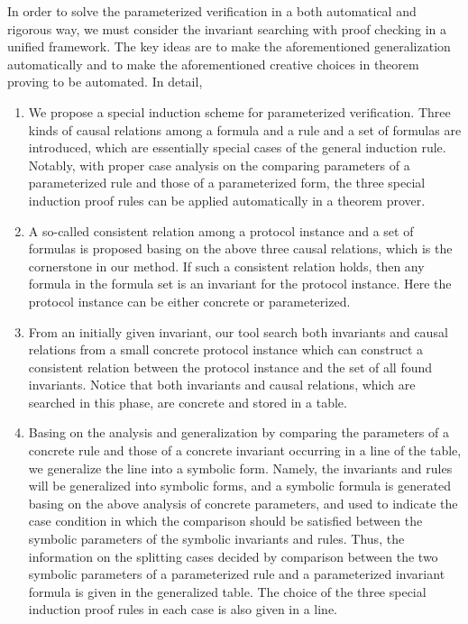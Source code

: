 \documentclass[final]{IEEEtran}
\begin{document}
{In order to solve the parameterized
verification %
 in a both automatical and rigorous way, we must consider the invariant searching with proof checking in a unified framework. The key ideas are  to make the aforementioned generalization automatically and to make the aforementioned creative choices in theorem proving to be automated. In detail,

 \begin{enumerate}
 \item We propose a special induction scheme for parameterized verification.   Three kinds of causal
relations among a formula and a rule and a set of formulas are introduced, which are
essentially special cases of the general induction rule. Notably,  with proper case analysis on the comparing parameters of a parameterized rule and those of a parameterized form, the three special induction proof rules can be applied automatically in a theorem prover.

\item A so-called consistent relation among a protocol instance and a set of formulas is proposed basing on the above three causal
relations, which is the cornerstone in
our method. If such a consistent relation holds, then any formula in the formula set is an invariant for the protocol instance. Here the protocol instance can be either concrete or parameterized.


\item \label{step2} From an initially given invariant, our tool search both invariants and causal relations from a small concrete protocol instance  which can construct a consistent relation between the protocol instance and the set of all found invariants. Notice that both invariants and causal relations, which are searched in this phase, are  concrete  and stored in a table.

\item \label{step3} Basing on the  analysis and generalization by comparing the  parameters of a concrete rule and those of a concrete invariant occurring in a line of the table, we  generalize the line into a symbolic form. Namely, the invariants and rules will be generalized into symbolic forms, and a symbolic formula is generated basing on the above analysis of concrete parameters, and used to  indicate the  case condition in which the comparison should be satisfied between  the symbolic parameters of the symbolic invariants and rules. Thus, the information on the splitting cases decided by comparison between  the two symbolic parameters of a parameterized rule and a parameterized invariant formula is given in the generalized table. The choice of the three special induction proof rules in each case is also given in a line.


\end{enumerate}}
\end{document}
